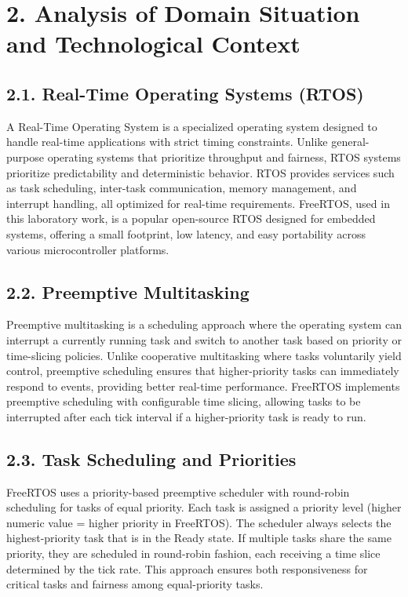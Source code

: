 \documentclass[12pt]{article}
\begin{document}
\section*{2. Analysis of Domain Situation and Technological Context}

\subsection*{2.1. Real-Time Operating Systems (RTOS)}

A Real-Time Operating System is a specialized operating system designed to handle real-time applications with strict timing constraints. Unlike general-purpose operating systems that prioritize throughput and fairness, RTOS systems prioritize predictability and deterministic behavior. RTOS provides services such as task scheduling, inter-task communication, memory management, and interrupt handling, all optimized for real-time requirements. FreeRTOS, used in this laboratory work, is a popular open-source RTOS designed for embedded systems, offering a small footprint, low latency, and easy portability across various microcontroller platforms.

\subsection*{2.2. Preemptive Multitasking}

Preemptive multitasking is a scheduling approach where the operating system can interrupt a currently running task and switch to another task based on priority or time-slicing policies. Unlike cooperative multitasking where tasks voluntarily yield control, preemptive scheduling ensures that higher-priority tasks can immediately respond to events, providing better real-time performance. FreeRTOS implements preemptive scheduling with configurable time slicing, allowing tasks to be interrupted after each tick interval if a higher-priority task is ready to run.

\subsection*{2.3. Task Scheduling and Priorities}

FreeRTOS uses a priority-based preemptive scheduler with round-robin scheduling for tasks of equal priority. Each task is assigned a priority level (higher numeric value = higher priority in FreeRTOS). The scheduler always selects the highest-priority task that is in the Ready state. If multiple tasks share the same priority, they are scheduled in round-robin fashion, each receiving a time slice determined by the tick rate. This approach ensures both responsiveness for critical tasks and fairness among equal-priority tasks.
\end{document}

